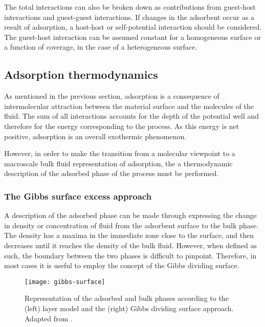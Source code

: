 The total interactions can also be broken down as contributions
from guest-host interactions and guest-guest interactions.
If changes in the adsorbent occur as a result of adsorption,
a host-host or self-potential interaction should be considered.
The guest-host interaction can be assumed constant for a homogeneous
surface or a function of coverage, in the case of a
heterogeneous surface.

\subsection{Adsorption thermodynamics}

As mentioned in the previous section, adsorption
is a consequence of intermolecular attraction between the
material surface and the molecules of the fluid. The sum of
all interactions accounts for the depth of the potential
well and therefore for the energy corresponding to the
process. As this energy is net positive, adsorption is an
overall exothermic phenomenon.

However, in order to make the transition from a molecular
viewpoint to a macroscale bulk fluid representation of
adsorption, the a thermodynamic description of the adsorbed
phase of the process must be performed.

\subsubsection{The Gibbs surface excess approach}

A description of the adsorbed phase can be made through
expressing the change in density or concentration of fluid
from the adsorbent surface to the bulk phase. The density
has a maxima in the immediate zone close to the surface, and then
decreases until it reaches the density of the bulk fluid.
However, when defined as such, the boundary between the
two phases is difficult to pinpoint.
Therefore, in most cases it is useful to employ the concept
of the Gibbs dividing surface.

\begin{figure}[htb]
	\centering

	\texttt{[image: gibbs-surface]}
	\caption{
		Representation of the adsorbed and bulk phases according to
		the (left) layer model and the (right) Gibbs dividing surface
		approach. Adapted from \citeauthor{rouquerolAdsorptionPowdersPorous2013}%
		\cite{rouquerolAdsorptionPowdersPorous2013}.
	}%
	\label{calo:fig:gibbs-surface}

\end{figure}

